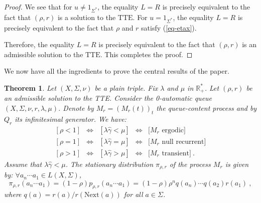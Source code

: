 \documentclass[11pt,a4paper]{article}
\newtheorem{theorem}{Theorem}[section]
\theoremstyle{remark}
\def\Blackboardfont{\mathbb}
\def\rig{\text{Next}}
\def\R{{\Blackboardfont R}}
\def\iff{\Longleftrightarrow}
\def\eref#1{(\ref{#1})}
\begin{document}
\begin{proof}
We see that for $u\neq 1_{\Sigma^*}$, the equality $L=R$ is
precisely equivalent to the fact that $(\rho,r)$ is a solution to
the $\text{TTE}$. For $u=1_{\Sigma^*}$, the equality $L=R$ is
precisely equivalent to the fact that $\rho$ and $r$ satisfy
\eref{eq-etax}.

Therefore, the equality $L=R$ is precisely equivalent to the fact
that $(\rho,r)$ is an admissible solution to the $\text{TTE}$.
This completes the proof.
\end{proof}


We now have all the
ingredients to prove the central results of the
paper.


\begin{theorem}\label{th-main}
Let $(X,\Sigma,\nu)$ be a plain triple. Fix $\lambda$ and
$\mu$ in $\R_+^*$.
Let $(\rho,r)$ be an admissible solution to the TTE.
Consider the 0-automatic queue
  $(X,\Sigma,\nu,r,\lambda,\mu)$.  Denote by $M_r=(M_r(t))_t$ the
  queue-content process and by $Q_r$ its infinitesimal generator.
We have:
\begin{equation*}
\begin{array}{ccccc}
[ \rho < 1 ] & \iff & [ \lambda\widehat{\gamma} < \mu
  ] & \iff & \bigl[ M_r \text{ ergodic} \bigr] \\
\left[ \rho = 1 \right] & \iff & [ \lambda\widehat{\gamma} = \mu
  ] & \iff & \bigl[ M_r \text{ null recurrent} \bigr] \\
\left[ \rho > 1 \right] & \iff & [ \lambda\widehat{\gamma} > \mu
  ] & \iff & \bigl[ M_r \text{ transient} \bigr] \:.
\end{array}
\end{equation*}
Assume that $\lambda\widehat{\gamma} <\mu$. The stationary
distribution $\pi_{\rho,r}$ of the process $M_r$ is given by:
$\forall a_n\cdots a_1 \in L(X,\Sigma)$,
\begin{equation}\label{eq-statdist}
\pi_{\rho,r} (a_n\cdots a_1) = (1-\rho)p_{\rho,r}(a_n\cdots a_1) =
(1-\rho)\rho^n q(a_n)\cdots q(a_{2}) r(a_1)\:,
\end{equation}
where $q(a)=r(a)/r(\rig(a))$ for all $a\in \Sigma$.
\end{theorem}
\end{document}

